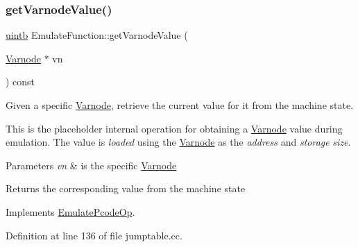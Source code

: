 \subsubsection{\texorpdfstring{getVarnodeValue()}{getVarnodeValue()}}
{\footnotesize\ttfamily \mbox{\hyperlink{types_8h_a2db313c5d32a12b01d26ac9b3bca178f}{uintb}} Emulate\+Function\+::get\+Varnode\+Value (\begin{DoxyParamCaption}\item[{\mbox{\hyperlink{class_varnode}{Varnode}} $\ast$}]{vn }\end{DoxyParamCaption}) const\hspace{0.3cm}{\ttfamily [virtual]}}



Given a specific \mbox{\hyperlink{class_varnode}{Varnode}}, retrieve the current value for it from the machine state. 

This is the placeholder internal operation for obtaining a \mbox{\hyperlink{class_varnode}{Varnode}} value during emulation. The value is {\itshape loaded} using the \mbox{\hyperlink{class_varnode}{Varnode}} as the {\itshape address} and {\itshape storage} {\itshape size}. 
\begin{DoxyParams}{Parameters}
{\em vn} & is the specific \mbox{\hyperlink{class_varnode}{Varnode}} \\
\hline
\end{DoxyParams}
\begin{DoxyReturn}{Returns}
the corresponding value from the machine state 
\end{DoxyReturn}


Implements \mbox{\hyperlink{class_emulate_pcode_op_a90f1046ddac488b5a88b5b151a307eca}{Emulate\+Pcode\+Op}}.



Definition at line 136 of file jumptable.\+cc.

